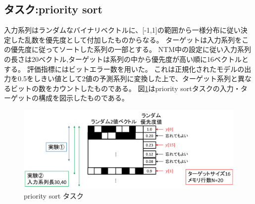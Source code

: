 \subsection{タスク:priority sort}
入力系列はランダムなバイナリベクトルに、[-1,1]の範囲から一様分布に従い決定した乱数を優先度として付加したものからなる。
ターゲットは入力系列をこの優先度に従ってソートした系列の一部とする。
NTM中の設定に従い入力系列の長さは20ベクトル,ターゲットは系列の中から優先度が高い順に16ベクトルとする。
評価指標にはビットエラー数を用いた。
これは正規化されたモデルの出力を0.5をしきい値として2値の予測系列に変換した上で、ターゲット系列と異なるビットの数をカウントしたものである。
図\ref{fig:priority}はpriority sortタスクの入力・ターゲットの構成を図示したものである。
\begin{figure}[t]
	\centering
	\includegraphics[width=\linewidth]{./figure/img_slide/priority.png}
	\caption{priority sort タスク}
	\label{fig:priority}
\end{figure}

